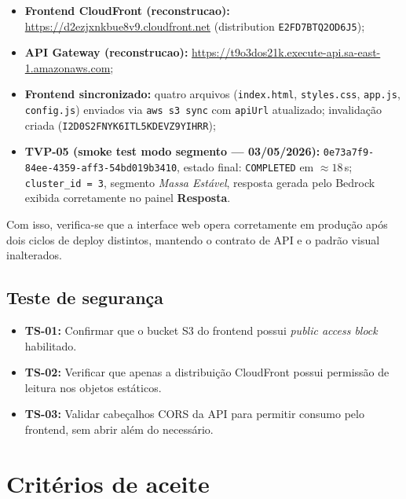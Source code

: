 \begin{itemize}[leftmargin=*]
  \item \textbf{Frontend CloudFront (reconstrucao):}
        \url{https://d2ezjxnkbue8v9.cloudfront.net}
        (distribution \texttt{E2FD7BTQ2OD6J5});
  \item \textbf{API Gateway (reconstrucao):}
        \url{https://t9o3dos21k.execute-api.sa-east-1.amazonaws.com};
  \item \textbf{Frontend sincronizado:} quatro arquivos
        (\texttt{index.html}, \texttt{styles.css}, \texttt{app.js},
        \texttt{config.js}) enviados via \texttt{aws s3 sync} com
        \texttt{apiUrl} atualizado; invalida\c{c}\~ao criada
        (\texttt{I2D0S2FNYK6ITL5KDEVZ9YIHRR});
  \item \textbf{TVP-05 (smoke test modo segmento --- 03/05/2026):}
        {\small\nolinkurl{0e73a7f9-84ee-4359-aff3-54bd019b3410}},
        estado final: \texttt{COMPLETED} em $\approx 18$\,s;
        \texttt{cluster\_id = 3}, segmento \emph{Massa Est\'avel},
        resposta gerada pelo Bedrock exibida corretamente no painel
        \textbf{Resposta}.
\end{itemize}

Com isso, verifica-se que a interface web opera corretamente em produ\c{c}\~ao
ap\'os dois ciclos de deploy distintos, mantendo o contrato de API e o
padr\~ao visual inalterados.

\subsection{Teste de seguran\c{c}a}

\begin{itemize}[leftmargin=*]
  \item \textbf{TS-01:} Confirmar que o bucket S3 do frontend possui
        \textit{public access block} habilitado.
  \item \textbf{TS-02:} Verificar que apenas a distribui\c{c}\~ao CloudFront
        possui permiss\~ao de leitura nos objetos est\'aticos.
  \item \textbf{TS-03:} Validar cabe\c{c}alhos CORS da API para
        permitir consumo pelo frontend, sem abrir al\'em do necess\'ario.
\end{itemize}

\section{Crit\'erios de aceite}

